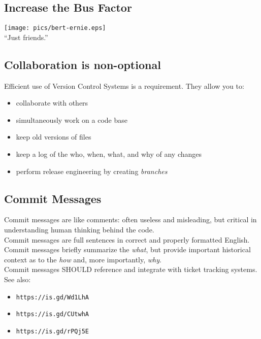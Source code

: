 \documentclass[xga]{xdvislides}
\begin{document}
\subsection{Increase the Bus Factor}
\vspace*{\fill}
\begin{center}
	\texttt{[image: pics/bert-ernie.eps]} \\
	\small
	``Just friends.''
\end{center}
\vspace*{\fill}

\subsection{Collaboration is non-optional}
Efficient use of Version Control Systems is a
requirement.  They allow you to:

\begin{itemize}
        \item collaborate with others
        \item simultaneously work on a code base
        \item keep old versions of files
        \item keep a log of the who, when, what, and why of any changes
        \item perform release engineering by creating {\em branches}
\end{itemize}

\subsection{Commit Messages}

Commit messages are like comments: often useless and
misleading, but critical in understanding human
thinking behind the code. \\

Commit messages are full sentences in correct and
properly formatted English.
\\

Commit messages briefly summarize the {\em what}, but
provide important historical context as to the {\em
how} and, more importantly, {\em why}. \\

Commit messages SHOULD reference and integrate with
ticket tracking systems. \\

See also:
\begin{itemize}
        \item \verb+https://is.gd/Wd1LhA+
        \item \verb+https://is.gd/CUtwhA+
        \item \verb+https://is.gd/rPQj5E+
\end{itemize}
\end{document}
